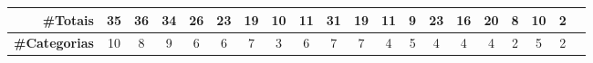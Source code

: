\begin{table*}
\begin{tabular}{@{}p{3.5cm}p{0.3cm}p{.2cm}p{.2cm}p{.2cm}p{.2cm}p{.2cm}p{.2cm}p{.2cm}p{.2cm}p{.2cm}p{.4cm}p{.4cm}p{.4cm}p{.4cm}p{.4cm}p{.4cm}p{.4cm}p{.4cm}p{.4cm}p{0.2cm}@{}}
\hline
\multicolumn{2}{r}{\textbf{\#Totais}} 		& \multicolumn{1}{c}{35} & \multicolumn{1}{c}{36} & \multicolumn{1}{c}{34} & \multicolumn{1}{c}{26} & \multicolumn{1}{c}{23} & \multicolumn{1}{c}{19} & \multicolumn{1}{c}{10} & \multicolumn{1}{c}{11} & \multicolumn{1}{c}{31} & \multicolumn{1}{c}{19} & \multicolumn{1}{c}{11} & \multicolumn{1}{c}{9} & \multicolumn{1}{c}{23} & \multicolumn{1}{c}{16} & \multicolumn{1}{c}{20} & \multicolumn{1}{c}{8} & \multicolumn{1}{c}{10} & \multicolumn{1}{c}{2} \\
\hline
\multicolumn{2}{r}{\textbf{\#Categorias}} 	& \multicolumn{1}{c}{10} & \multicolumn{1}{c}{8} & \multicolumn{1}{c}{9} & \multicolumn{1}{c}{6} & \multicolumn{1}{c}{6} & \multicolumn{1}{c}{7} & \multicolumn{1}{c}{3} & \multicolumn{1}{c}{6} & \multicolumn{1}{c}{7} & \multicolumn{1}{c}{7} & \multicolumn{1}{c}{4} & \multicolumn{1}{c}{5} & \multicolumn{1}{c}{4} & \multicolumn{1}{c}{4} & \multicolumn{1}{c}{4} & \multicolumn{1}{c}{2} & \multicolumn{1}{c}{5} & \multicolumn{1}{c}{2} \\

\end{tabular}
\end{table*}
